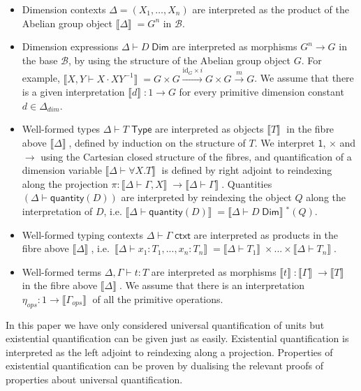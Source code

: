 \documentclass[a4paper,UKenglish]{lipics}
\newcommand{\ra}{\rightarrow}
\newcommand{\msf}[1]{\mathsf{#1}} %
\newcommand{\B}{\mathcal{B}}
\newcommand{\sem}[1]{\ensuremath{\llbracket #1 \rrbracket} \;}
\newcommand{\unitTy}{\msf{1}}
\newcommand{\qnt}{\msf{quantity}}
\newcommand{\Deltadim}{\ensuremath{\Delta_{dim}}}
\newcommand{\Gammaops}{\ensuremath{\Gamma_{ops}}}
\newcommand{\etaops}{\ensuremath{\eta_{ops}}}
\newcommand{\Dj}[2]{#1 \vdash #2 \; \msf{ Dim}}
\newcommand{\id}{\mathrm{id}}
\begin{document}
\begin{itemize}
\item Dimension contexts $\Delta = (X_1, \ldots, X_n)$ are interpreted as the product of the Abelian group object $\sem{\Delta} = G^n$ in $\B$.
\item Dimension expressions $\Dj \Delta D$ are interpreted as morphisms $G^n \ra G$ in the base $\B$, by using the structure of the Abelian group object $G$. For example, $\sem{X, Y \vdash X \cdot XY^{-1}} = G\times G\xrightarrow{\id_G\times i}G\times G\xrightarrow m G$. We assume that there is a given interpretation $\sem d : 1 \to G$ for every primitive dimension constant $d \in \Deltadim$.

\item Well-formed types $\Delta \vdash T \; \msf{ Type}$ are interpreted as objects $\sem{T}$ in the fibre above $\sem{\Delta}$,  defined by induction on the structure of $T$. We interpret $\unitTy$, $\times$ and $\rightarrow$ using the Cartesian closed structure of the fibres, and quantification of a dimension variable $\sem{\Delta \vdash \forall X. T}$ is defined by right adjoint to reindexing along the projection $\pi: \sem{\Delta \vdash \Gamma, X} \rightarrow \sem{\Delta \vdash \Gamma}$. Quantities $(\Delta \vdash \qnt(D))$ are interpreted by reindexing the object $Q$ along the interpretation of $D$, i.e. $\sem{\Delta \vdash \qnt(D)} = {\sem{\Dj \Delta D}}\!^* (Q)$.

\item Well-formed typing contexts $\Delta \vdash \Gamma \; \msf{ ctxt}$ are interpreted as products in the fibre above $\sem{\Delta}$, i.e.\ $\sem{\Delta \vdash x_1 : T_1 ,..., x_n:T_n} = \sem{\Delta \vdash T_1} \times ... \times \sem{\Delta \vdash T_n}$.

\item Well-formed terms $\Delta, \Gamma \vdash t : T$ are interpreted as morphisms $\sem{t} : \sem{\Gamma} \ra \sem{T}$ in the fibre above $\sem{\Delta}$. We assume that there is an interpretation $\etaops : 1 \to \sem{\Gammaops}$ of all the primitive operations.
\end{itemize}

In this paper we have only considered universal quantification of units but existential quantification can be given just as easily. Existential quantification is interpreted as the left adjoint to reindexing along a projection. Properties of  existential quantification can be proven by dualising the relevant proofs of properties about universal quantification.
\end{document}
